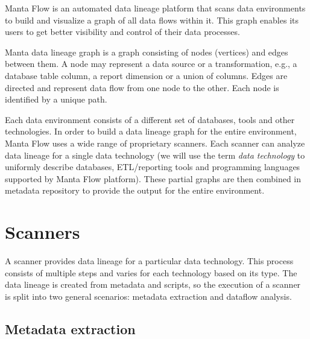 Manta Flow is an automated data lineage platform that scans data environments to build and visualize a graph of all data flows within it. This graph enables its users to get better visibility and control of their data processes.
\par
Manta data lineage graph is a graph consisting of nodes (vertices) and edges between them. A node may represent a data source or a transformation, e.g., a database table column, a report dimension or a union of columns. Edges are directed and represent data flow from one node to the other. Each node is identified by a unique path.
\par
Each data environment consists of a different set of databases, tools and other technologies. In order to build a data lineage graph for the entire environment, Manta Flow uses a wide range of proprietary scanners. Each scanner can analyze data lineage for a single data technology (we will use the term \textit{data technology} to uniformly describe databases, ETL/reporting tools and programming languages supported by Manta Flow platform). These partial graphs are then combined in metadata repository to provide the output for the entire environment.

\section{Scanners}

A scanner provides data lineage for a particular data technology. This process consists of multiple steps and varies for each technology based on its type. The data lineage is created from metadata and scripts, so the execution of a scanner is split into two general scenarios: metadata extraction and dataflow analysis.

\subsection{Metadata extraction}

